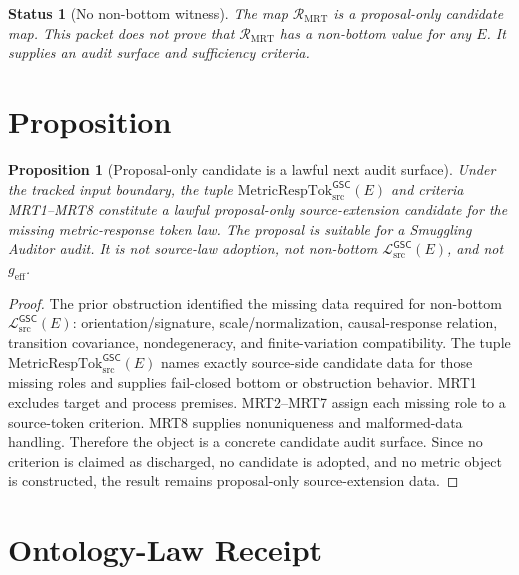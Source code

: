 \documentclass[11pt]{article}
\newcommand{\MetricRespTok}{\mathrm{MetricRespTok}_{\mathrm{src}}^{\mathsf{GSC}}}
\newcommand{\MetricData}{\mathcal{L}_{\mathrm{src}}^{\mathsf{GSC}}}
\newcommand{\geff}{g_{\mathrm{eff}}}
\newtheorem{proposition}{Proposition}
\newtheorem{status}{Status}
\begin{document}
\begin{status}[No non-bottom witness]
The map \(\mathcal{R}_{\mathrm{MRT}}\) is a proposal-only candidate map. This
packet does not prove that \(\mathcal{R}_{\mathrm{MRT}}\) has a non-bottom
value for any \(E\). It supplies an audit surface and sufficiency criteria.
\end{status}

\section{Proposition}

\begin{proposition}[Proposal-only candidate is a lawful next audit surface]
Under the tracked input boundary, the tuple \(\MetricRespTok(E)\) and criteria
MRT1--MRT8 constitute a lawful proposal-only source-extension candidate for
the missing metric-response token law. The proposal is suitable for a
Smuggling Auditor audit. It is not source-law adoption, not non-bottom
\(\MetricData(E)\), and not \(\geff\).
\end{proposition}

\begin{proof}
The prior obstruction identified the missing data required for non-bottom
\(\MetricData(E)\): orientation/signature, scale/normalization,
causal-response relation, transition covariance, nondegeneracy, and
finite-variation compatibility. The tuple \(\MetricRespTok(E)\) names exactly
source-side candidate data for those missing roles and supplies fail-closed
bottom or obstruction behavior. MRT1 excludes target and process premises.
MRT2--MRT7 assign each missing role to a source-token criterion. MRT8 supplies
nonuniqueness and malformed-data handling. Therefore the object is a concrete
candidate audit surface. Since no criterion is claimed as discharged, no
candidate is adopted, and no metric object is constructed, the result remains
proposal-only source-extension data.
\end{proof}

\section{Ontology-Law Receipt}
\end{document}
